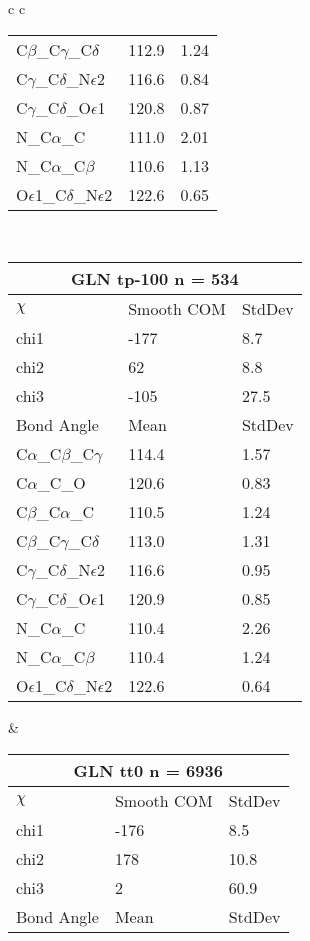 \begin{longtable}{ c c }
\begin{tabular}{ l l l }
  C$\beta$\_C$\gamma$\_C$\delta$ & 112.9 & 1.24\\
  C$\gamma$\_C$\delta$\_N$\epsilon$2 & 116.6 & 0.84\\
  C$\gamma$\_C$\delta$\_O$\epsilon$1 & 120.8 & 0.87\\
  N\_C$\alpha$\_C & 111.0 & 2.01\\
  N\_C$\alpha$\_C$\beta$ & 110.6 & 1.13\\
  O$\epsilon$1\_C$\delta$\_N$\epsilon$2 & 122.6 & 0.65\\
  \bottomrule
  \end{tabular}
  \\
  \begin{tabular}{ l l l }
  \toprule
  \multicolumn{3}{c}{GLN \textbf{tp-100} n = 534} \\ \toprule
  $\chi$       & Smooth COM & StdDev \\ \midrule
  chi1 & -177 & 8.7 \\ 
  chi2 & 62 & 8.8 \\ 
  chi3 & -105 & 27.5 \\ \midrule
  Bond Angle   & Mean     & StdDev \\ \midrule
  C$\alpha$\_C$\beta$\_C$\gamma$ & 114.4 & 1.57\\
  C$\alpha$\_C\_O & 120.6 & 0.83\\
  C$\beta$\_C$\alpha$\_C & 110.5 & 1.24\\
  C$\beta$\_C$\gamma$\_C$\delta$ & 113.0 & 1.31\\
  C$\gamma$\_C$\delta$\_N$\epsilon$2 & 116.6 & 0.95\\
  C$\gamma$\_C$\delta$\_O$\epsilon$1 & 120.9 & 0.85\\
  N\_C$\alpha$\_C & 110.4 & 2.26\\
  N\_C$\alpha$\_C$\beta$ & 110.4 & 1.24\\
  O$\epsilon$1\_C$\delta$\_N$\epsilon$2 & 122.6 & 0.64\\
  \bottomrule
  \end{tabular}
  &
  \begin{tabular}{ l l l }
  \toprule
  \multicolumn{3}{c}{GLN \textbf{tt0} n = 6936} \\ \toprule
  $\chi$       & Smooth COM & StdDev \\ \midrule
  chi1 & -176 & 8.5 \\ 
  chi2 & 178 & 10.8 \\ 
  chi3 & 2 & 60.9 \\ \midrule
  Bond Angle   & Mean     & StdDev \\ \midrule

\end{tabular}
\end{longtable}
